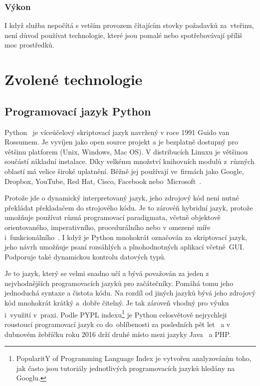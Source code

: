 \subsubsection*{Výkon}
I když služba nepočítá s vetším provozem čítajícím stovky požadavků za~vteřinu, není důvod používat technologie, které jsou pomalé
nebo spotřebovávají příliš moc prostředků.

\section{Zvolené technologie}

\subsection{Programovací jazyk Python}

Python~\cite{python} je víceúčelový skriptovací jazyk navržený v roce 1991 \cite{python_year} Guido van Rossumem.
Je vyvíjen jako open source projekt a je bezplatně dostupný pro většinu platforem (Unix, Windows, Mac OS).
V distribucích Linuxu je většinou součástí základní instalace. Díky velkému množství knihovních modulů z~různých oblastí
má velice široké uplatnění. Běžně jej používají ve~firmách jako Google, Dropbox, YouTube, Red Hat, Cisco,
Facebook nebo~Microsoft~\cite{python_companies}.

Protože jde o dynamický interpretovaný jazyk, jeho zdrojový kód není nutné překládat překladačem do strojového kódu.
Je to zárovéň hybridní jazyk, protože umožňuje používat různá programovací paradigmata, včetně objektově orientovaného,
imperativního, procedurálního nebo v omezené míře i~funkcio\-nálního~\cite{python_about}. I když je Python mnohokrát označován za skriptovací jazyk,
jeho návrh umožňuje psaní rozsáhlých a plnohodnotných aplikací včetně~GUI. Podporuje také dynamickou kontrolu datových typů.

Je to jazyk, který se velmi snadno učí a bývá považován za jeden z nejvhodnějších programovacích jazyků pro začátečníky.
Pomáhá tomu jeho jednoduchá syntaxe a čistota kódu. Na rozdíl od jiných jazyků bývá jeho zdrojový kód mnohokrát krátký a~dobře čitelný.
Je tak zároveň vhodný pro výuku i~využití v~praxi. Podle PYPL indexu\footnote{PopularitY of Programming Language Index je vytvořen analyzováním toho,
jak často jsou tutoriály jednotlivých programovacích jazyků hledány na Googlu.} je Python celosvětově nejrychleji roustoucí programovací jazyk
co do~oblíbenosti za posledních pět let~\cite{python_pypl} a v dubnovém žebříčku roku 2016 drží druhé místo mezi jazyky Java~\cite{java} a PHP.

